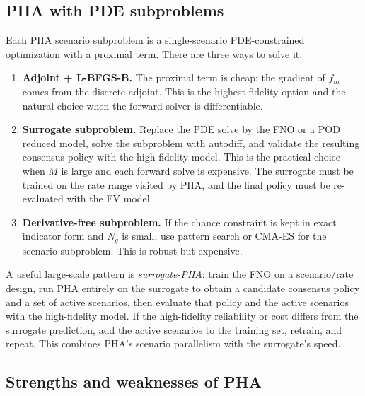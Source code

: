 \documentclass[11pt]{article}
\numberwithin{equation}{section}
\theoremstyle{plain}
\begin{document}
\subsection{PHA with PDE subproblems}

Each PHA scenario subproblem is a single-scenario PDE-constrained optimization
with a proximal term.  There are three ways to solve it:
\begin{enumerate}[leftmargin=1.6em,itemsep=2pt]
  \item \textbf{Adjoint + L-BFGS-B.}  The proximal term is cheap; the
        gradient of $f_m$ comes from the discrete adjoint.  This is the
        highest-fidelity option and the natural choice when the forward solver
        is differentiable.
  \item \textbf{Surrogate subproblem.}  Replace the PDE solve by the FNO or a
        POD reduced model, solve the subproblem with autodiff, and validate the
        resulting consensus policy with the high-fidelity model.  This is the
        practical choice when $M$ is large and each forward solve is
        expensive.  The surrogate must be trained on the rate range visited by
        PHA, and the final policy must be re-evaluated with the FV model.
  \item \textbf{Derivative-free subproblem.}  If the chance constraint is kept
        in exact indicator form and $N_q$ is small, use pattern search or
        CMA-ES for the scenario subproblem.  This is robust but expensive.
\end{enumerate}

A useful large-scale pattern is \emph{surrogate-PHA}: train the FNO on a
scenario/rate design, run PHA entirely on the surrogate to obtain a candidate
consensus policy and a set of active scenarios, then evaluate that policy and
the active scenarios with the high-fidelity model.  If the high-fidelity
reliability or cost differs from the surrogate prediction, add the active
scenarios to the training set, retrain, and repeat.  This combines PHA's
scenario parallelism with the surrogate's speed.

\subsection{Strengths and weaknesses of PHA}
\end{document}
